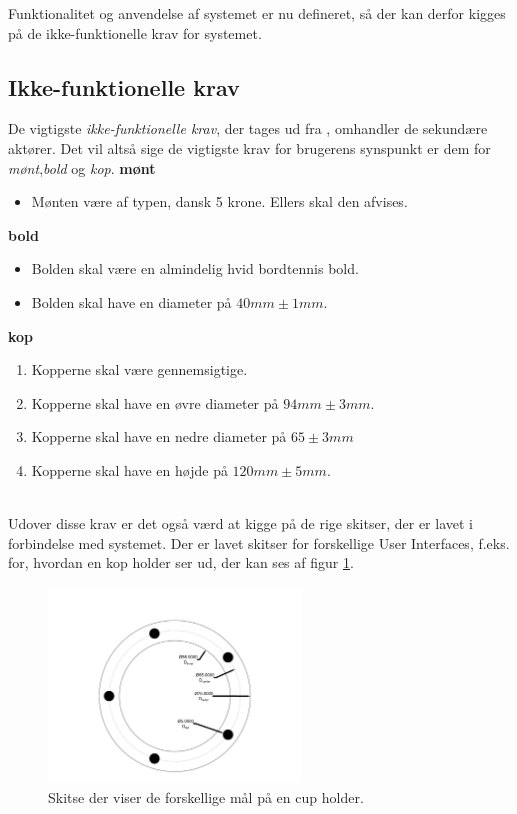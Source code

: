 \documentclass[Rapport/Rapport_main.tex]{subfiles}
\begin{document}
Funktionalitet og anvendelse af systemet er nu defineret, så der kan derfor kigges på de ikke-funktionelle krav for systemet.

\subsection{Ikke-funktionelle krav}
De vigtigste \textit{ikke-funktionelle krav}, der tages ud fra , omhandler de sekundære aktører. Det vil altså sige de vigtigste krav for brugerens synspunkt er dem for \textit{mønt},\textit{bold} og \textit{kop}. \textbf{mønt}
\begin{itemize}
    \item Mønten være af typen, dansk 5 krone. Ellers skal den afvises. 
\end{itemize}
\textbf{bold}
\begin{itemize}
    \item Bolden skal være en almindelig hvid bordtennis bold.
    \item Bolden skal have en diameter på $40mm \pm{1mm}$.
\end{itemize}
\textbf{kop} 
\begin{enumerate}
    \item Kopperne skal være gennemsigtige.
    \item Kopperne skal have en øvre diameter på $94mm \pm{3mm}$.
    \item Kopperne skal have en nedre diameter på $65 \pm{3mm}$
    \item Kopperne skal have en højde på $120mm \pm{5mm}$.
\end{enumerate}\\
Udover disse krav er det også værd at kigge på de rige skitser, der er lavet i forbindelse med systemet. Der er lavet skitser for forskellige User Interfaces, f.eks. for, hvordan en kop holder ser ud, der kan ses af figur \ref{fig:rap_LEDplacement}.
\begin{figure}[H]
    \centering
    \includegraphics[width=0.6\textwidth,trim={2in 0.4in 2in 1.3in},clip, page=1]{Kravspecifikation/Ikke-funktionelle/graphics/LEDplacement.pdf}
    \caption{Skitse der viser de forskellige mål på en cup holder.}
    \label{fig:rap_LEDplacement}
\end{figure}
\end{document}
